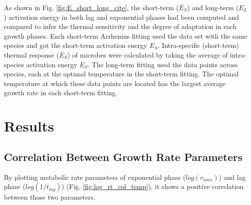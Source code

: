 \documentclass[a4paper]{article}
\begin{document}
As shown in Fig. \ref{fig:E_short_long_cite}, the short-term ($\bar{E}_S$) and long-term (${E}_L$) activation energy in both lag and exponential phases had been computed and compared to infer the thermal sensitivity and the degree of adaptation in each growth phases. Each short-term Arrhenius fitting used the data set with the same species and got the short-term activation energy $E_S$. Intra-specific (short-term) thermal response ($\bar{E}_{S}$) of microbes were calculated by taking the average of intra-species activation energy $E_S$. The long-term fitting used the data points across species, each at the optimal temperature in the short-term fitting. The optimal temperature at which these data points are located has the largest average growth rate in each short-term fitting. \\




\section{Results}

\subsection{Correlation Between Growth Rate Parameters}

By plotting metabolic rate parameters of exponential phase ($log(r_{max})$) and lag phase ($log(1/t_{lag})$) (Fig. \ref{fig:log_rt_col_temp}), it shows a positive correlation between those two parameters. \\
\end{document}
